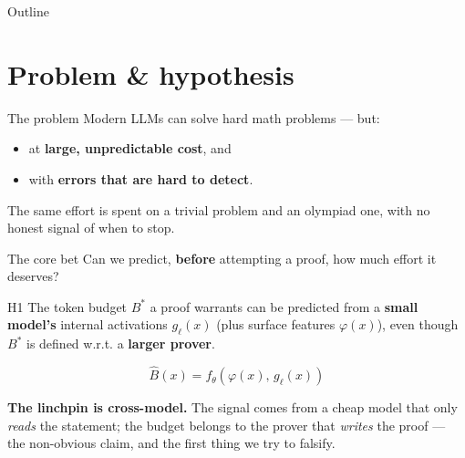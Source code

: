 \documentclass[aspectratio=169,12pt,t,compress]{beamer}
\begin{document}
\begin{frame}
	\titlepage
\end{frame}

\begin{frame}{Outline}
	\tableofcontents
\end{frame}

\section{Problem \& hypothesis}

\begin{frame}{The problem}
	Modern LLMs can solve hard math problems --- but:

	\vspace{0.5em}
	\begin{itemize}
		\item at \textbf{large, unpredictable cost}, and
		\item with \textbf{errors that are hard to detect}.
	\end{itemize}

	\vspace{0.6em}
	The same effort is spent on a trivial problem and an olympiad one, with no
	honest signal of when to stop.
\end{frame}

\begin{frame}{The core bet}
	Can we predict, \textbf{before} attempting a proof, how much effort it deserves?

	\vspace{0.3em}
	\begin{block}{H1}
		\small
		The token budget $B^*$ a proof warrants can be predicted from a
		\textbf{small model's} internal activations $g_\ell(x)$ (plus surface
		features $\varphi(x)$), even though $B^*$ is defined w.r.t. a
		\textbf{larger prover}.
	\end{block}

	\vspace{-0.2em}
	\[
		\hat{B}(x) = f_\theta\!\left(\varphi(x),\, g_\ell(x)\right)
	\]

	\vspace{-0.2em}
	\textbf{The linchpin is cross-model.} The signal comes from a cheap model
	that only \emph{reads} the statement; the budget belongs to the prover that
	\emph{writes} the proof --- the non-obvious claim, and the first thing we try
	to falsify.
\end{frame}
\end{document}

